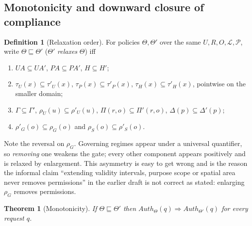 \documentclass[11pt]{article}
\theoremstyle{definition}
\newtheorem{definition}{Definition}
\theoremstyle{plain}
\newtheorem{theorem}{Theorem}
\theoremstyle{remark}
\newcommand{\Auth}{\mathit{Auth}}
\newcommand{\Ldom}{\mathcal{L}}
\newcommand{\Pdom}{\mathcal{P}}
\begin{document}
\subsection{Monotonicity and downward closure of compliance}

\begin{definition}[Relaxation order]
\label{def:relax}
For policies $\Theta, \Theta'$ over the same $U, R, O, \Ldom, \Pdom$, write
$\Theta \sqsubseteq \Theta'$ ($\Theta'$ \emph{relaxes} $\Theta$) iff
\begin{enumerate}
  \item[(i)] $UA \subseteq UA'$, \; $PA \subseteq PA'$, \; $H \subseteq H'$;
  \item[(ii)] $\tau_U(x) \subseteq \tau'_U(x)$, \; $\tau_P(x) \subseteq
        \tau'_P(x)$, \; $\tau_H(x) \subseteq \tau'_H(x)$, pointwise on the
        smaller domain;
  \item[(iii)] $\Gamma \subseteq \Gamma'$, \; $\rho_U(u) \subseteq \rho'_U(u)$,
        \; $\Pi(r,o) \subseteq \Pi'(r,o)$, \; $\Delta(p) \subseteq \Delta'(p)$;
  \item[(iv)] $\rho'_G(o) \subseteq \rho_G(o)$ \; and \;
        $\rho_S(o) \subseteq \rho'_S(o)$.
\end{enumerate}
\end{definition}

Note the reversal on $\rho_G$. Governing regimes appear under a universal
quantifier, so \emph{removing} one weakens the gate; every other component
appears positively and is relaxed by enlargement. This asymmetry is easy to get
wrong and is the reason the informal claim ``extending validity intervals,
purpose scope or spatial area never removes permissions'' in the earlier draft
is not correct as stated: enlarging $\rho_G$ removes permissions.

\begin{theorem}[Monotonicity]
\label{thm:monotone}
If $\Theta \sqsubseteq \Theta'$ then
$\Auth_\Theta(q) \Rightarrow \Auth_{\Theta'}(q)$ for every request $q$.
\end{theorem}
\end{document}
